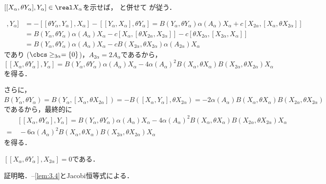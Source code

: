 \begin{pfwn}{}

  $[[X_{\alpha}, \theta Y_{\alpha}], Y_{\alpha}]  \in \real X_{\alpha} $を示せば， と併せて  が従う．

  
  \begin{align*}
    [[X_{\alpha}, \theta Y_{\alpha}], Y_{\alpha}] &= -[[\theta Y_{\alpha}, Y_{\alpha}], X_{\alpha}] - [[Y_{\alpha}, X_{\alpha}], \theta Y_{\alpha}] = B(Y_{\alpha}, \theta Y_{\alpha})\alpha(A_{\alpha})X_{\alpha} +c[X_{2\alpha},[X_{\alpha}, \theta X_{2\alpha}]] \\
                                                  &= B(Y_{\alpha}, \theta Y_{\alpha})\alpha(A_{\alpha})X_{\alpha} - c[X_{\alpha}, [\theta X_{2\alpha}, X_{2\alpha}]] - c[\theta X_{2\alpha},[X_{2\alpha},X_{\alpha}]] \\
                                                  &= B(Y_{\alpha}, \theta Y_{\alpha})\alpha(A_{\alpha})X_{\alpha} - cB(X_{2\alpha},\theta X_{2\alpha})\alpha(A_{2\alpha})X_{\alpha}
  \end{align*}
  であり ($\cbcs \ge_{3\alpha} = \{0\} $)，$A_{2\alpha} = 2A_{\alpha} $であるから，\\
  $[[X_{\alpha}, \theta Y_{\alpha}], Y_{\alpha}] =  B(Y_{\alpha}, \theta Y_{\alpha})\alpha(A_{\alpha})X_{\alpha} - 4\alpha(A_{\alpha})^2B(X_{\alpha}, \theta X_{\alpha})B(X_{2\alpha}, \theta X_{2\alpha})X_{\alpha} $を得る．

さらに，$B(Y_{\alpha}, \theta Y_{\alpha}) = B(Y_{\alpha},[X_{\alpha}, \theta X_{2\alpha}]) = -B([X_{\alpha}, Y_{\alpha}], \theta X_{2\alpha}) = -2\alpha(A_{\alpha})B(X_{\alpha},\theta X_{\alpha})B(X_{2\alpha}, \theta X_{2\alpha})  $であるから，最終的に
\begin{align*}
  &[[X_{\alpha}, \theta Y_{\alpha}], Y_{\alpha}] =  B(Y_{\alpha}, \theta Y_{\alpha})\alpha(A_{\alpha})X_{\alpha} - 4\alpha(A_{\alpha})^2B(X_{\alpha}, \theta X_{\alpha})B(X_{2\alpha}, \theta X_{2\alpha})X_{\alpha} \\
  =&\ -6\alpha(A_{\alpha})^2B(X_{\alpha}, \theta X_{\alpha})B(X_{2\alpha}, \theta X_{2\alpha})X_{\alpha}
\end{align*}
を得る．
  
\end{pfwn}

\begin{lem}\label{lem:3.5}
  $[[X_{\alpha}, \theta Y_{\alpha}], X_{2\alpha}] = 0$である．

  証明略．--\ref{lem:3.4}とJacobi恒等式による．
\end{lem}

